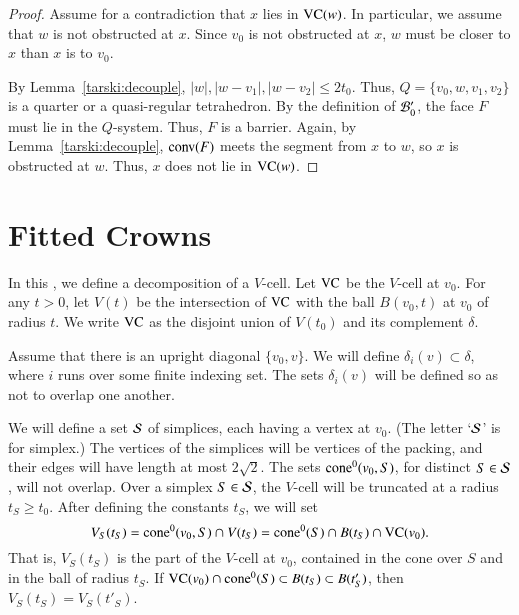 \begin{proof}
Assume for a contradiction that $x$ lies in ${\operatorname{VC}}(w)$. In
particular, we assume that $w$ is not obstructed at $x$.  Since
$v_0$ is not obstructed at $x$, $w$ must be closer to $x$
than $x$ is to $v_0$.

By Lemma~\ref{tarski:decouple}, 
   $|w|,|w-v_1|,|w-v_2|\le 2t_0$.  Thus, $Q=\{v_0,w,v_1,v_2\}$ is
a quarter or a quasi-regular tetrahedron.  By the definition of
${\mathcal B}'_0$, the face $F$ must lie in the $Q$-system.  Thus,
$F$ is a barrier.  Again, by Lemma~\ref{tarski:decouple},
${\operatorname{conv}}(F)$ meets the segment from $x$ to $w$, so $x$ is obstructed
at $w$.  Thus, $x$ does not lie in ${\operatorname{VC}}(w)$.
\end{proof}





\section{Fitted Crowns}%
    \label{sec:fine-overview}



In this \chap, we define a decomposition of a $V$-cell. Let
${\operatorname{VC}}$ be the $V$-cell at $v_0$.  For any $t > 0$, let
$V(t)$ be the intersection of ${\operatorname{VC}}$ with the ball $B(v_0,t)$ at
$v_0$ of radius $t$. We write ${\operatorname{VC}}$ as the disjoint union
of $V(t_0)$ and its complement $\delta$.

Assume that there is an upright 
diagonal $\{v_0,v\}$. 
We will define $\delta_i(v)\subset\delta$, where $i$ runs
over some finite indexing set.
The sets $\delta_i(v)$ will be defined so as not to overlap
one another. 

We will define a set ${\mathcal S}$ of simplices, each having a vertex at
$v_0$. (The letter `${\mathcal S}$' is for simplex.)
The vertices of the simplices will be vertices of the
packing, and their edges will have length at most $2\sqrt{2}$. The
sets ${\operatorname{cone}}^0(v_0,S)$, for distinct $S\in{\mathcal S}$, will not overlap. Over a
simplex $S\in{\mathcal S}$, the $V$-cell will be truncated at a radius
$t_S\ge t_0$. After defining the constants $t_S$, we will set
    $$V_S(t_S) = {\operatorname{cone}}^0(v_0,S) \cap V(t_S) ={\operatorname{cone}}^0(S)\cap B(t_S)\cap {\operatorname{VC}}(v_0).$$
That is, $V_S(t_S)$ is the part of the $V$-cell at $v_0$,
contained in the cone over $S$ and in the ball of radius $t_S$.
If
    ${\operatorname{VC}}(v_0) \cap {\operatorname{cone}}^0(S)\subset B(t_S)\subset B(t'_S)$,
then
    $V_S(t_S)=V_S(t'_S)$.

